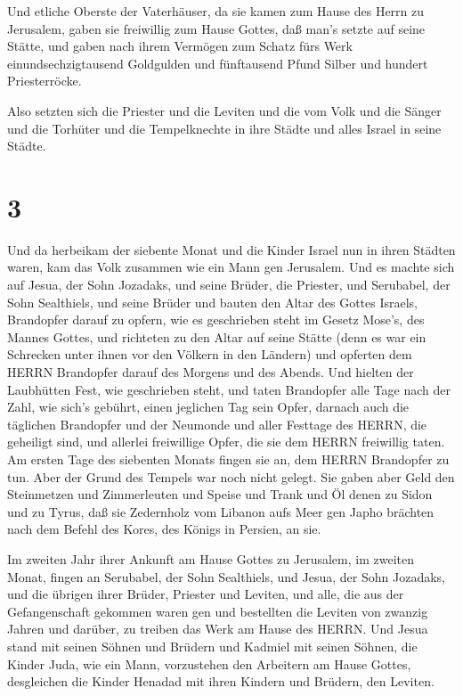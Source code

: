  Und etliche Oberste der Vaterhäuser, da sie kamen zum
Hause des Herrn zu Jerusalem, gaben sie freiwillig zum Hause Gottes, daß
man's setzte auf seine Stätte,  und gaben nach ihrem
Vermögen zum Schatz fürs Werk einundsechzigtausend Goldgulden und
fünftausend Pfund Silber und hundert Priesterröcke.

 Also setzten sich die Priester und die Leviten und die vom
Volk und die Sänger und die Torhüter und die Tempelknechte in ihre
Städte und alles Israel in seine Städte.

\hypertarget{section-2}{%
\section{3}\label{section-2}}

 Und da herbeikam der siebente Monat und die Kinder Israel
nun in ihren Städten waren, kam das Volk zusammen wie ein Mann gen
Jerusalem.  Und es machte sich auf Jesua, der Sohn Jozadaks,
und seine Brüder, die Priester, und Serubabel, der Sohn Sealthiels, und
seine Brüder und bauten den Altar des Gottes Israels, Brandopfer darauf
zu opfern, wie es geschrieben steht im Gesetz Mose's, des Mannes Gottes,
 und richteten zu den Altar auf seine Stätte (denn es war
ein Schrecken unter ihnen vor den Völkern in den Ländern) und opferten
dem HERRN Brandopfer darauf des Morgens und des Abends.  Und
hielten der Laubhütten Fest, wie geschrieben steht, und taten Brandopfer
alle Tage nach der Zahl, wie sich's gebührt, einen jeglichen Tag sein
Opfer,  darnach auch die täglichen Brandopfer und der
Neumonde und aller Festtage des HERRN, die geheiligt sind, und allerlei
freiwillige Opfer, die sie dem HERRN freiwillig taten.  Am
ersten Tage des siebenten Monats fingen sie an, dem HERRN Brandopfer zu
tun. Aber der Grund des Tempels war noch nicht gelegt.  Sie
gaben aber Geld den Steinmetzen und Zimmerleuten und Speise und Trank
und Öl denen zu Sidon und zu Tyrus, daß sie Zedernholz vom Libanon aufs
Meer gen Japho brächten nach dem Befehl des Kores, des Königs in
Persien, an sie.

 Im zweiten Jahr ihrer Ankunft am Hause Gottes zu Jerusalem,
im zweiten Monat, fingen an Serubabel, der Sohn Sealthiels, und Jesua,
der Sohn Jozadaks, und die übrigen ihrer Brüder, Priester und Leviten,
und alle, die aus der Gefangenschaft gekommen waren gen und bestellten
die Leviten von zwanzig Jahren und darüber, zu treiben das Werk am Hause
des HERRN.  Und Jesua stand mit seinen Söhnen und Brüdern
und Kadmiel mit seinen Söhnen, die Kinder Juda, wie ein Mann,
vorzustehen den Arbeitern am Hause Gottes, desgleichen die Kinder
Henadad mit ihren Kindern und Brüdern, den Leviten.

